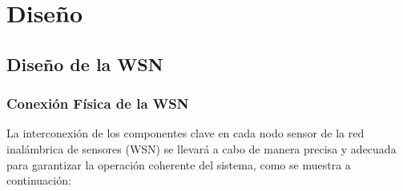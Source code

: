 \chapter{Dise\~no}

\section{Diseño de la WSN}

\subsection{Conexión Física de la WSN}
La interconexión de los componentes clave en cada nodo sensor de la red inalámbrica de sensores (WSN) se llevará a cabo de manera precisa y adecuada para garantizar la operación coherente del sistema, como se muestra a continuación:
